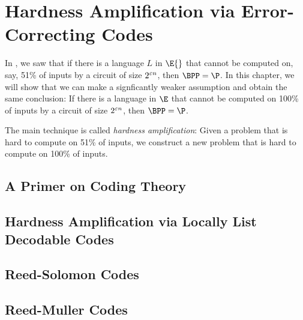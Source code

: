 \chapter{Hardness Amplification via Error-Correcting Codes}
\label{lec:03}

In , we saw that if there is a language $L$ in $\E{}$ that cannot
be computed on, say, 51\% of inputs by a circuit of size $2^{\varepsilon n}$, then $\BPP = \P$. In
this chapter, we will show that we can
make a signficantly weaker assumption and obtain the same conclusion: If there
is a language in $\E$ that cannot be computed on 100\% of inputs by a circuit of size $2^{\varepsilon
n}$, then $\BPP = \P$.

The main technique is called \emph{hardness amplification}: Given a problem that is hard to compute on 51\% of inputs, we construct a new problem that is hard to compute on 100\% of inputs.

\section{A Primer on Coding Theory}

\section{Hardness Amplification via Locally List Decodable Codes}

\section{Reed-Solomon Codes}

\section{Reed-Muller Codes}
